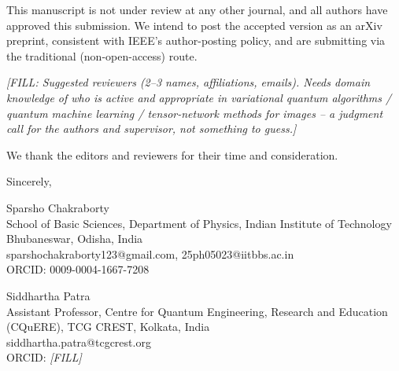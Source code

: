 \documentclass[11pt]{article}
\begin{document}
\smallskip
\noindent This manuscript is not under review at any other journal, and all authors have approved this submission. We intend to post the accepted version as an arXiv preprint, consistent with IEEE's author-posting policy, and are submitting via the traditional (non-open-access) route.

\bigskip
\noindent \emph{[FILL: Suggested reviewers (2--3 names, affiliations, emails). Needs domain knowledge of who is active and appropriate in variational quantum algorithms / quantum machine learning / tensor-network methods for images -- a judgment call for the authors and supervisor, not something to guess.]}

\bigskip
\noindent We thank the editors and reviewers for their time and consideration.

\bigskip
\noindent Sincerely,

\bigskip
\noindent Sparsho Chakraborty \\
School of Basic Sciences, Department of Physics, Indian Institute of Technology Bhubaneswar, Odisha, India \\
sparshochakraborty123@gmail.com, 25ph05023@iitbbs.ac.in \\
ORCID: 0009-0004-1667-7208

\bigskip
\noindent Siddhartha Patra \\
Assistant Professor, Centre for Quantum Engineering, Research and Education (CQuERE), TCG CREST, Kolkata, India \\
siddhartha.patra@tcgcrest.org \\
ORCID: \emph{[FILL]}
\end{document}

